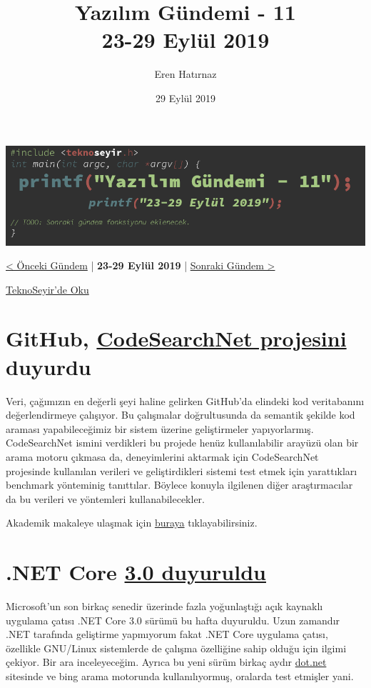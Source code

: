 \documentclass[11pt]{article}
\author{Eren Hatırnaz}
\date{29 Eylül 2019}
\title{Yazılım Gündemi - 11\\\medskip
\large 23-29 Eylül 2019}
\begin{document}
\maketitle
\tableofcontents \clearpage\shorthandoff{=}

\begin{center}
\includegraphics[width=.9\linewidth]{gorseller/yazilim-gundemi-banner.png}
\end{center}

\begin{center}
\href{../10/yazilim-gundemi-10.pdf}{< Önceki Gündem} | \textbf{23-29 Eylül 2019} | \href{../12/yazilim-gundemi-12.pdf}{Sonraki Gündem >}

\href{https://teknoseyir.com/blog/yazilim-gundemi-11-23-29-eylul-2019}{TeknoSeyir'de Oku}
\end{center}

\section{GitHub, \href{https://github.blog/2019-09-26-introducing-the-codesearchnet-challenge/}{CodeSearchNet projesini} duyurdu}
\label{sec:org3723ac5}
Veri, çağımızın en değerli şeyi haline gelirken GitHub'da elindeki kod
veritabanını değerlendirmeye çalışıyor. Bu çalışmalar doğrultusunda da semantik
şekilde kod araması yapabileceğimiz bir sistem üzerine geliştirmeler
yapıyorlarmış. CodeSearchNet ismini verdikleri bu projede henüz kullanılabilir
arayüzü olan bir arama motoru çıkmasa da, deneyimlerini aktarmak için
CodeSearchNet projesinde kullanılan verileri ve geliştirdikleri sistemi test
etmek için yarattıkları benchmark yönteminig tanıttılar. Böylece konuyla
ilgilenen diğer araştırmacılar da bu verileri ve yöntemleri kullanabilecekler.

Akademik makaleye ulaşmak için \href{https://arxiv.org/abs/1909.09436}{buraya} tıklayabilirsiniz.
\section{.NET Core \href{https://devblogs.microsoft.com/dotnet/announcing-net-core-3-0/}{3.0 duyuruldu}}
\label{sec:orge5ce025}
Microsoft'un son birkaç senedir üzerinde fazla yoğunlaştığı açık kaynaklı
uygulama çatısı .NET Core 3.0 sürümü bu hafta duyuruldu. Uzun zamandır .NET
tarafında geliştirme yapmıyorum fakat .NET Core uygulama çatısı, özellikle
GNU/Linux sistemlerde de çalışma özelliğine sahip olduğu için ilgimi çekiyor.
Bir ara inceleyeceğim. Ayrıca bu yeni sürüm birkaç aydır \href{https://dot.net}{dot.net} sitesinde ve
bing arama motorunda kullanılıyormuş, oralarda test etmişler yani.
\end{document}
